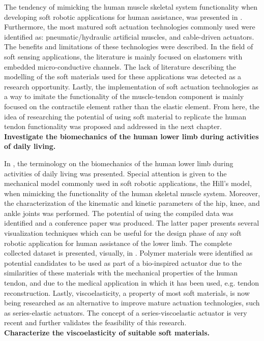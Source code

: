 The tendency of mimicking the human muscle skeletal system functionality when developing soft robotic applications for human assistance, was presented in . Furthermore, the most matured soft actuation technologies commonly used were identified as: pneumatic/hydraulic artificial muscles, and cable-driven actuators. The benefits and limitations of these technologies were described. In the field of soft sensing applications, the literature is mainly focused on elastomers with embedded micro-conductive channels. The lack of literature describing the modelling of the soft materials used for these applications was detected as a research opportunity. Lastly, the implementation of soft actuation technologies as a way to imitate the functionality of the muscle-tendon component is mainly focused on the contractile element rather than the elastic element. From here, the idea of researching the potential of using soft material to replicate the human tendon functionality was proposed and addressed in the next chapter.
\\[1em]
\noindent \textbf{\large{  Investigate the biomechanics of the human lower limb during activities of daily living.}}

In , the terminology on the biomechanics of the human lower limb during activities of daily living was presented. Special attention is given to the mechanical model commonly used in soft robotic applications, the Hill's model, when mimicking the functionality of the human skeletal muscle system. Moreover, the characterization of the kinematic and kinetic parameters of the hip, knee, and ankle joints was performed. The potential of using the compiled data was identified and a conference paper was produced. The latter paper presents several visualization techniques which can be useful for the design phase of any soft robotic application for human assistance of the lower limb. The complete collected dataset is presented, visually, in . Polymer materials were identified as potential candidates to be used as part of a bio-inspired actuator due to the similarities of these materials with the mechanical properties of the human tendon, and due to the medical application in which it has been used, e.g. tendon reconstruction. Lastly, viscoelasticity, a property of most soft materials, is now being researched as an alternative to improve mature actuation technologies, such as series-elastic actuators. The concept of a series-viscoelastic actuator is very recent and further validates the feasibility of this research.
\\[1em]
\noindent \textbf{\large{ Characterize the viscoelasticity of suitable soft materials.}}

